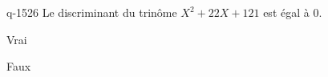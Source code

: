 \begin{truefalse}{q-1526}
Le discriminant du trinôme $X^2+22X+121$ est égal à $0$.
\item* Vrai
\item Faux
\end{truefalse}

